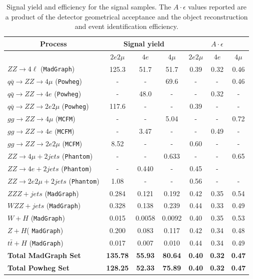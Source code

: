 \begin{table}[htbH]
\begin{center}
\caption{Signal yield and efficiency for the signal samples.
The $A\cdot\epsilon$ values reported are a product of the detector geometrical acceptance and
the object reconstruction and event identification efficiency.}
 \label{tab:Aeps_samples}
\begin{tabular}{lcccccc}
\hline  \multicolumn{1}{c}{Process} & \multicolumn{3}{c}{Signal yield} & \multicolumn{3}{c}{$A\cdot\epsilon$}\\
\hline  & $2e2\mu$ & $4e$& $4\mu$ & $2e2\mu$ & $4e$ &$4\mu$\\ 
\hline $ZZ\to 4\ell$ (\texttt{MadGraph}) & 125.3& 51.7 &51.7 &0.39 & 0.32& 0.46  \\
 $q\bar{q}\to ZZ\to 4\mu$  (\texttt{Powheg})& - & - & 69.6 & - & - & 0.46\\
$q\bar{q}\to ZZ\to 4e$  (\texttt{Powheg}) & - & 48.0 & - & - & 0.32 & -\\
$q\bar{q} \to ZZ\to 2e2\mu$  (\texttt{Powheg}) & 117.6 & - & - & 0.39 & - & -\\
$gg\to ZZ\to 4\mu$  (\texttt{MCFM})& - & - & 5.04& - & - & 0.72\\
$gg\to ZZ\to 4e$  (\texttt{MCFM}) & - & 3.47 & - & - & 0.49 & -\\
$gg\to ZZ\to 2e2\mu$  (\texttt{MCFM})& 8.52 & - & - & 0.60 & - & -\\
$ZZ\to 4\mu +2jets$  (\texttt{Phantom})& - & - & 0.633 & - & - & 0.65\\
$ZZ\to 4e +2jets$  (\texttt{Phantom})& - & 0.440 & - & 0.45 &-\\
$ZZ\to 2e2\mu +2jets$  (\texttt{Phantom})& 1.08 & - & - & 0.56 & - & -\\
$ZZZ + jets$ (\texttt{MadGraph}) & 0.284 & 0.121 & 0.192 & 0.42 & 0.35 & 0.54\\
$WZZ + jets$ (\texttt{MadGraph}) & 0.328 & 0.138 & 0.239 & 0.44 & 0.33 & 0.49\\
$W + H$ (\texttt{MadGraph})& 0.015 & 0.0058 & 0.0092 & 0.40 & 0.35 & 0.53\\
$Z + H$( \texttt{MadGraph}) & 0.200 & 0.083 & 0.117 & 0.42 & 0.34 & 0.48\\
$t\bar{t}+H$ (\texttt{MadGraph})& 0.017 & 0.007 & 0.010 & 0.44 & 0.34 & 0.49\\
\hline
\textbf{Total MadGraph Set} & \textbf{135.78} &\textbf{55.93} &\textbf{80.64} & \textbf{0.40} & \textbf{0.32} & \textbf{0.47}\\
\textbf{Total Powheg Set} & \textbf{128.25} &\textbf{52.33} &\textbf{75.89} & \textbf{0.40} & \textbf{0.32} & \textbf{0.47}\\
 \hline
\end{tabular}
\end{center}
\end{table}
